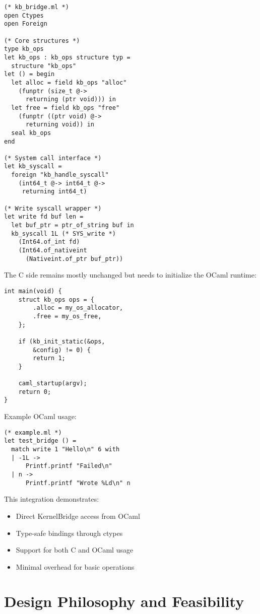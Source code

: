 \documentclass[conference]{IEEEtran}
\begin{document}
\begin{verbatim}
(* kb_bridge.ml *)
open Ctypes
open Foreign

(* Core structures *)
type kb_ops
let kb_ops : kb_ops structure typ = 
  structure "kb_ops"
let () = begin
  let alloc = field kb_ops "alloc" 
    (funptr (size_t @-> 
      returning (ptr void))) in
  let free = field kb_ops "free" 
    (funptr ((ptr void) @-> 
      returning void)) in
  seal kb_ops
end

(* System call interface *)
let kb_syscall = 
  foreign "kb_handle_syscall"
    (int64_t @-> int64_t @-> 
     returning int64_t)

(* Write syscall wrapper *)
let write fd buf len =
  let buf_ptr = ptr_of_string buf in
  kb_syscall 1L (* SYS_write *)
    (Int64.of_int fd)
    (Int64.of_nativeint 
      (Nativeint.of_ptr buf_ptr))
\end{verbatim}

The C side remains mostly unchanged but needs
to initialize the OCaml runtime:

\begin{verbatim}
int main(void) {
    struct kb_ops ops = {
        .alloc = my_os_allocator,
        .free = my_os_free,
    };
    
    if (kb_init_static(&ops, 
        &config) != 0) {
        return 1;
    }
    
    caml_startup(argv);
    return 0;
}
\end{verbatim}

Example OCaml usage:

\begin{verbatim}
(* example.ml *)
let test_bridge () =
  match write 1 "Hello\n" 6 with
  | -1L -> 
      Printf.printf "Failed\n"
  | n -> 
      Printf.printf "Wrote %Ld\n" n
\end{verbatim}

This integration demonstrates:
\begin{itemize}
	\item Direct KernelBridge access from OCaml
	\item Type-safe bindings through ctypes
	\item Support for both C and OCaml usage
	\item Minimal overhead for basic operations
\end{itemize}

\section{Design Philosophy and Feasibility}
\end{document}
